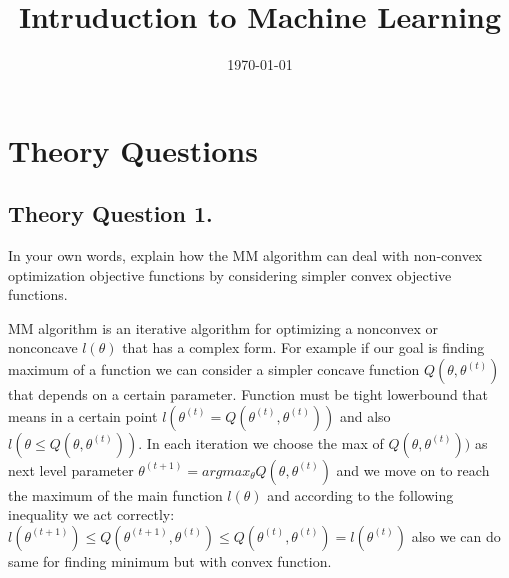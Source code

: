 \documentclass[12pt]{article}
\title{Intruduction to Machine Learning}
\date{\today}
\begin{document}
\maketitlepage
\maketitlestart

\section{Theory Questions}
\subsection{Theory Question 1.}
In your own words, explain how the MM algorithm can deal with non-convex optimization objective functions by considering simpler convex objective functions.
\begin{qsolve}[solution]
    MM algorithm is an iterative algorithm for optimizing a nonconvex or nonconcave $l(\theta)$ that has a complex form. For example if our goal is finding maximum of a function we can consider a simpler concave function $Q(\theta,\theta^{(t)})$ that depends on a certain parameter. Function must be tight lowerbound that means in a certain point $l(\theta^{(t)}=Q(\theta^{(t)},\theta^{(t)}))$ and also $l(\theta\leq Q(\theta,\theta^{(t)}))$. In each iteration we choose the max of $Q(\theta,\theta^{(t)}))$ as next level parameter $\theta^{(t+1)}=argmax_{\theta}Q(\theta,\theta^{(t)})$ and we move on to reach the maximum of the main function $l(\theta)$ and according to the following inequality
    we act correctly:
    \\$l(\theta^{(t+1)})\leq Q(\theta^{(t+1)},\theta^{(t)})\leq Q(\theta^{(t)},\theta^{(t)})=l(\theta^{(t)})$
    also we can do same for finding minimum but with convex function.
\end{qsolve}
\end{document}
